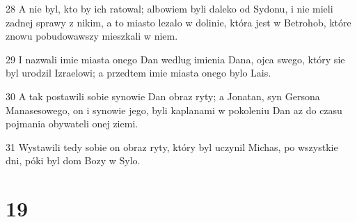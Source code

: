 \par 28 A nie byl, kto by ich ratowal; albowiem byli daleko od Sydonu, i nie mieli zadnej sprawy z nikim, a to miasto lezalo w dolinie, która jest w Betrohob, które znowu pobudowawszy mieszkali w niem.
\par 29 I nazwali imie miasta onego Dan wedlug imienia Dana, ojca swego, który sie byl urodzil Izraelowi; a przedtem imie miasta onego bylo Lais.
\par 30 A tak postawili sobie synowie Dan obraz ryty; a Jonatan, syn Gersona Manasesowego, on i synowie jego, byli kaplanami w pokoleniu Dan az do czasu pojmania obywateli onej ziemi.
\par 31 Wystawili tedy sobie on obraz ryty, który byl uczynil Michas, po wszystkie dni, póki byl dom Bozy w Sylo.

\chapter{19}

